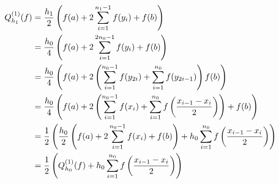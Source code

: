 \begin{align*}
    Q_{h_1}^{(1)}(f)
    & = \frac{h_1}{2}
        \left ( 
            f(a) +
            2 \sum_{i=1}^{n_1 - 1} f(y_i) +
            f(b)
         \right ) \\
    & = \frac{h_0}{4}
        \left ( 
            f(a) +
            2 \sum_{i=1}^{2 n_0 - 1} f(y_i) +
            f(b)
         \right ) \\
    & = \frac{h_0}{4}
        \left ( 
            f(a) +
            2 \left ( 
                \sum_{i=1}^{n_0 - 1} f(y_{2i}) +
                \sum_{i=1}^{n_0} f(y_{2i-1})
             \right )
            f(b)
         \right ) \\
    & = \frac{h_0}{4}
        \left ( 
            f(a) +
            2 \left ( 
                \sum_{i=1}^{n_0 - 1} f(x_i) +
                \sum_{i=1}^{n_0} f \left ( \frac{x_{i-1} - x_i}{2} \right )
             \right ) +
            f(b)
         \right ) \\
    & = \frac{1}{2}
        \left ( 
            \frac{h_0}{2}
            \left ( 
            f(a) +
            2 \sum_{i=1}^{n_0 - 1} f(x_i) +
            f(b)
             \right ) +
            h_0 \sum_{i=1}^{n_0} f \left ( \frac{x_{i-1} - x_i}{2} \right )
         \right ) \\
    & = \frac{1}{2}
        \left ( 
            Q_{h_0}^{(1)}(f) +
            h_0 \sum_{i=1}^{n_0} f \left ( \frac{x_{i-1} - x_i}{2} \right )
         \right )
    \label{effiziente_extrapolation}
\end{align*}